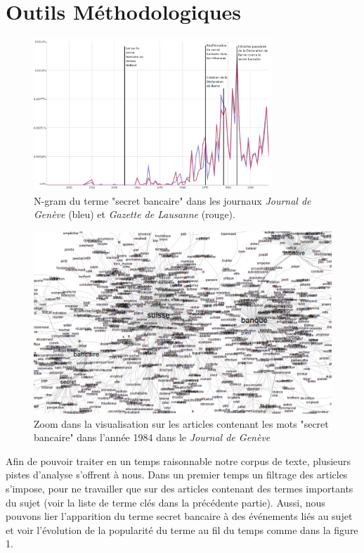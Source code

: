 \documentclass[11pt]{article}
\begin{document}
\section{Outils Méthodologiques}
\begin{figure}[t]
  \centering
\includegraphics[width=0.8\textwidth]{ngram.png}
\caption{
  N-gram du terme "secret bancaire" dans les journaux \textit{Journal de Genève}
  (bleu) et \textit{Gazette de Lausanne} (rouge).
}
\end{figure}
\begin{figure}[hb]
  \centering
  \includegraphics[width=1.0\textwidth]{reduced.png}
  \caption{Zoom dans la visualisation sur les articles contenant les mots "secret 
bancaire" dans l'année 1984 dans le \textit{Journal de Genève}}
\end{figure}
Afin de pouvoir traiter en un temps raisonnable notre corpus de texte, plusieurs
pistes d’analyse s’offrent à nous. Dans un premier temps un filtrage des
articles s’impose, pour ne travailler que sur des articles contenant des termes
importants du sujet (voir la liste de terme clés dans la précédente partie).
Aussi, nous pouvons lier l'apparition du terme secret bancaire à des événements
liés au sujet et voir l'évolution de la popularité du terme au fil du temps comme dans
la figure 1.
\end{document}
